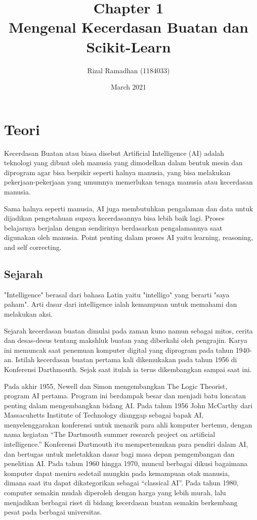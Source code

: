 \documentclass{article}
\title{Chapter 1 \\
Mengenal Kecerdasan Buatan dan
Scikit-Learn}
\author{Rizal Ramadhan (1184033)}
\date{March 2021}
\begin{document}
\maketitle 
\section{Teori}
Kecerdasan Buatan atau biasa disebut Artificial Intelligence (AI) adalah teknologi yang dibuat oleh manusia yang dimodelkan dalam bentuk mesin dan diprogram agar bisa berpikir seperti halnya manusia, yang bisa melakukan pekerjaan-pekerjaan yang umumnya memerlukan tenaga manusia atau kecerdasan manusia. 

Sama halnya seperti manusia, AI juga membutuhkan pengalaman dan data untuk dijadikan pengetahuan supaya kecerdasannya bisa lebih baik lagi. Proses belajarnya berjalan dengan sendirinya berdasarkan pengalamannya saat digunakan oleh manusia. Point penting dalam proses AI yaitu learning, reasoning, and self correcting.

\subsection{Sejarah}
"Intelligence" berasal dari bahasa Latin yaitu "intelligo" yang berarti "saya paham". Arti dasar dari intelligence ialah kemampuan untuk memahami dan melakukan aksi.

Sejarah kecerdasan buatan dimulai pada zaman kuno namun sebagai mitos, cerita dan desas-desus tentang makshluk buatan yang diberkahi oleh pengrajin. Karya ini memuncak saat penemuan komputer digital yang diprogram pada tahun 1940-an.
Istilah kecerdasan buatan pertama kali dikemukakan pada tahun 1956 di Konferensi Darthmouth. Sejak saat itulah ia terus dikembangkan sampai saat ini.

Pada akhir 1955, Newell dan Simon mengembangkan  The Logic Theorist, program AI pertama. Program ini berdampak besar dan menjadi batu loncatan penting dalam mengembangkan bidang AI. Pada tahun 1956 John McCarthy dari  Massacuhetts Institute of Technology dianggap sebagai bapak AI, menyelenggarakan konferensi untuk menarik para ahli komputer bertemu, dengan  nama kegiatan “The Dartmouth summer research project on artificial intelligence.”   Konferensi Dartmouth itu mempertemukan para pendiri dalam AI, dan bertugas untuk meletakkan dasar bagi masa depan  pemgembangan dan penelitian AI. Pada  tahun 1960 hingga 1970, muncul berbagai dikusi bagaimana komputer dapat meniru sedetail mungkin pada kemampuan otak manusia, dimana saat itu dapat dikategorikan sebagai “classical AI”. Pada tahun 1980, computer semakin mudah diperoleh dengan harga yang lebih murah, lalu menjadikan berbagai riset di bidang kecerdasan buatan semakin berkembang pesat pada berbagai universitas.
\end{document}

